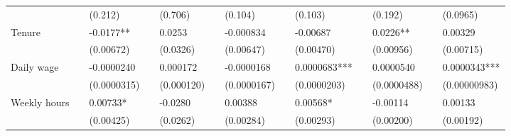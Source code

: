 \begin{tabular}{rrrrrrrrrrrrr}
\multicolumn{1}{l}{} & \multicolumn{1}{l}{} & \multicolumn{1}{l}{(0.212)} & \multicolumn{1}{l}{} & \multicolumn{1}{l}{(0.706)} & \multicolumn{1}{l}{} & \multicolumn{1}{l}{(0.104)} & \multicolumn{1}{l}{} & \multicolumn{1}{l}{(0.103)} & \multicolumn{1}{l}{} & \multicolumn{1}{l}{(0.192)} & \multicolumn{1}{l}{} & \multicolumn{1}{l}{(0.0965)} \\
\multicolumn{1}{l}{Tenure} & \multicolumn{1}{l}{} & \multicolumn{1}{l}{-0.0177**} & \multicolumn{1}{l}{} & \multicolumn{1}{l}{0.0253} & \multicolumn{1}{l}{} & \multicolumn{1}{l}{-0.000834} & \multicolumn{1}{l}{} & \multicolumn{1}{l}{-0.00687} & \multicolumn{1}{l}{} & \multicolumn{1}{l}{0.0226**} & \multicolumn{1}{l}{} & \multicolumn{1}{l}{0.00329} \\
\multicolumn{1}{l}{} & \multicolumn{1}{l}{} & \multicolumn{1}{l}{(0.00672)} & \multicolumn{1}{l}{} & \multicolumn{1}{l}{(0.0326)} & \multicolumn{1}{l}{} & \multicolumn{1}{l}{(0.00647)} & \multicolumn{1}{l}{} & \multicolumn{1}{l}{(0.00470)} & \multicolumn{1}{l}{} & \multicolumn{1}{l}{(0.00956)} & \multicolumn{1}{l}{} & \multicolumn{1}{l}{(0.00715)} \\
\multicolumn{1}{l}{Daily wage} & \multicolumn{1}{l}{} & \multicolumn{1}{l}{-0.0000240} & \multicolumn{1}{l}{} & \multicolumn{1}{l}{0.000172} & \multicolumn{1}{l}{} & \multicolumn{1}{l}{-0.0000168} & \multicolumn{1}{l}{} & \multicolumn{1}{l}{0.0000683***} & \multicolumn{1}{l}{} & \multicolumn{1}{l}{0.0000540} & \multicolumn{1}{l}{} & \multicolumn{1}{l}{0.0000343***} \\
\multicolumn{1}{l}{} & \multicolumn{1}{l}{} & \multicolumn{1}{l}{(0.0000315)} & \multicolumn{1}{l}{} & \multicolumn{1}{l}{(0.000120)} & \multicolumn{1}{l}{} & \multicolumn{1}{l}{(0.0000167)} & \multicolumn{1}{l}{} & \multicolumn{1}{l}{(0.0000203)} & \multicolumn{1}{l}{} & \multicolumn{1}{l}{(0.0000488)} & \multicolumn{1}{l}{} & \multicolumn{1}{l}{(0.00000983)} \\
\multicolumn{1}{l}{Weekly hours} & \multicolumn{1}{l}{} & \multicolumn{1}{l}{0.00733*} & \multicolumn{1}{l}{} & \multicolumn{1}{l}{-0.0280} & \multicolumn{1}{l}{} & \multicolumn{1}{l}{0.00388} & \multicolumn{1}{l}{} & \multicolumn{1}{l}{0.00568*} & \multicolumn{1}{l}{} & \multicolumn{1}{l}{-0.00114} & \multicolumn{1}{l}{} & \multicolumn{1}{l}{0.00133} \\
\multicolumn{1}{l}{} & \multicolumn{1}{l}{} & \multicolumn{1}{l}{(0.00425)} & \multicolumn{1}{l}{} & \multicolumn{1}{l}{(0.0262)} & \multicolumn{1}{l}{} & \multicolumn{1}{l}{(0.00284)} & \multicolumn{1}{l}{} & \multicolumn{1}{l}{(0.00293)} & \multicolumn{1}{l}{} & \multicolumn{1}{l}{(0.00200)} & \multicolumn{1}{l}{} & \multicolumn{1}{l}{(0.00192)} \\

\end{tabular}
